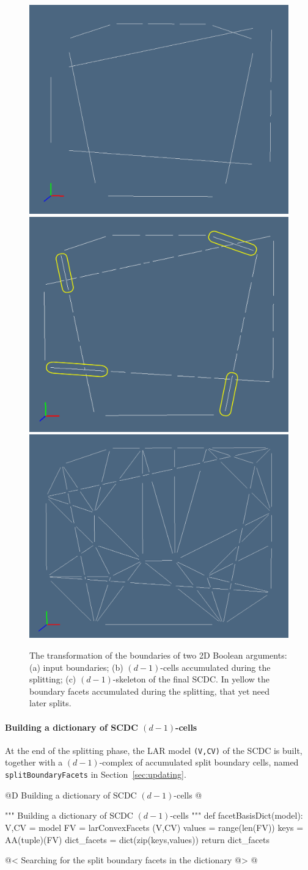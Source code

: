 \documentclass[11pt,oneside]{article}	%
\begin{document}
\begin{figure}[htbp] %
   \centering
   \includegraphics[height=0.26\linewidth,width=0.325\linewidth]{images/splitfacets0} 
   \includegraphics[height=0.26\linewidth,width=0.325\linewidth]{images/splitfacets1} 
   \includegraphics[height=0.26\linewidth,width=0.325\linewidth]{images/splitfacets2} 
   \caption{The transformation of the boundaries of two 2D Boolean arguments: (a) input boundaries; (b) $(d-1)$-cells accumulated during the splitting; (c) $(d-1)$-skeleton of the final SCDC. In yellow the boundary facets accumulated during the splitting, that yet need later splits.}
   \label{fig:splitfacets}
\end{figure}


\paragraph{Building a dictionary of SCDC $(d-1)$-cells}
At the end of the splitting phase, the LAR model \texttt{(V,CV)} of the SCDC is built, together with a $(d-1)$-complex of accumulated split boundary cells, named \texttt{splitBoundaryFacets} in Section~\ref{sec:updating}.

@D Building a dictionary of SCDC $(d-1)$-cells
@{""" Building a dictionary of SCDC $(d-1)$-cells """
def facetBasisDict(model):
	V,CV = model
	FV = larConvexFacets (V,CV)
	values = range(len(FV))
	keys = AA(tuple)(FV)
	dict_facets = dict(zip(keys,values))
	return dict_facets
	
@< Searching for the split boundary facets in the dictionary @>
@}
\end{document}
